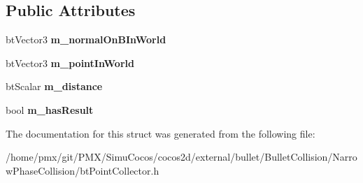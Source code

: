 \subsection*{Public Attributes}
\begin{DoxyCompactItemize}
\item 
\mbox{\label{structbtPointCollector_a3fd61b2d8440ac2bc2fa9bb6061eea34}} 
bt\+Vector3 {\bfseries m\+\_\+normal\+On\+B\+In\+World}
\item 
\mbox{\label{structbtPointCollector_ad10b05207fe3a122c99e35e153438964}} 
bt\+Vector3 {\bfseries m\+\_\+point\+In\+World}
\item 
\mbox{\label{structbtPointCollector_a8b957ea0488b58bf9d49bda1b0fa596d}} 
bt\+Scalar {\bfseries m\+\_\+distance}
\item 
\mbox{\label{structbtPointCollector_ac7b16569176ef840415c9ea000325b92}} 
bool {\bfseries m\+\_\+has\+Result}
\end{DoxyCompactItemize}


The documentation for this struct was generated from the following file\+:\begin{DoxyCompactItemize}
\item 
/home/pmx/git/\+P\+M\+X/\+Simu\+Cocos/cocos2d/external/bullet/\+Bullet\+Collision/\+Narrow\+Phase\+Collision/bt\+Point\+Collector.\+h\end{DoxyCompactItemize}
